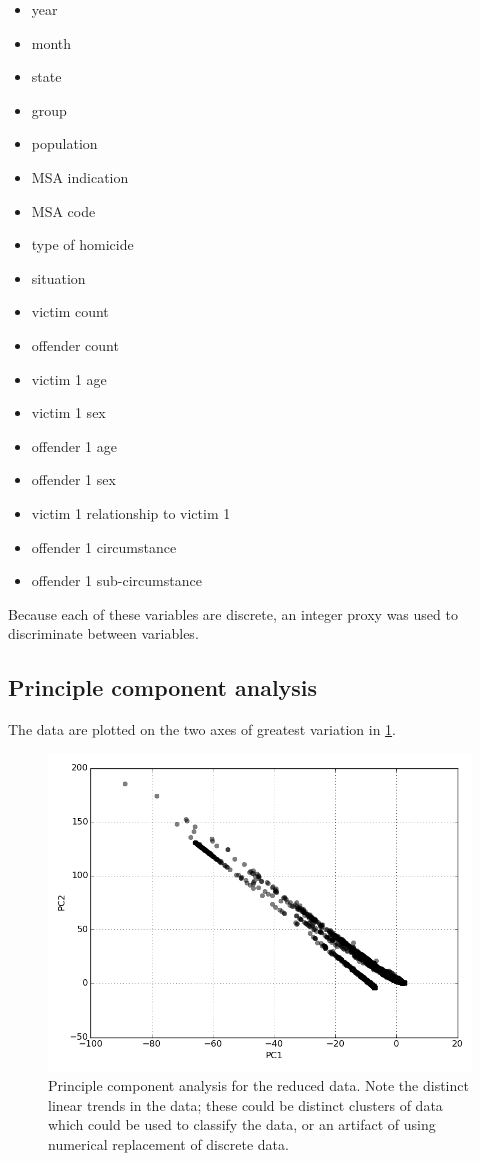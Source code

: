 \documentclass{evanarticle}
\begin{document}
\begin{itemize}
  \item year
  \item month
  \item state
  \item group
  \item population
  \item MSA indication
  \item MSA code
  \item type of homicide
  \item situation
  \item victim count
  \item offender count
  \item victim 1 age
  \item victim 1 sex
  \item offender 1 age
  \item offender 1 sex
  \item victim 1 relationship to victim 1
  \item offender 1 circumstance
  \item offender 1 sub-circumstance
\end{itemize}

Because each of these variables are discrete, an integer proxy was used to discriminate between variables.

\subsection{Principle component analysis} \label{sec_pca}

The data are plotted on the two axes of greatest variation in \cref{fig_pca}.

\begin{figure}[H]
  \centering
    \includegraphics[width=\linewidth]{images/PCA.png}
  \caption{Principle component analysis for the reduced data.  Note the distinct linear trends in the data; these could be distinct clusters of data which could be used to classify the data, or an artifact of using numerical replacement of discrete data.}
  \label{fig_pca}
\end{figure}
\end{document}
